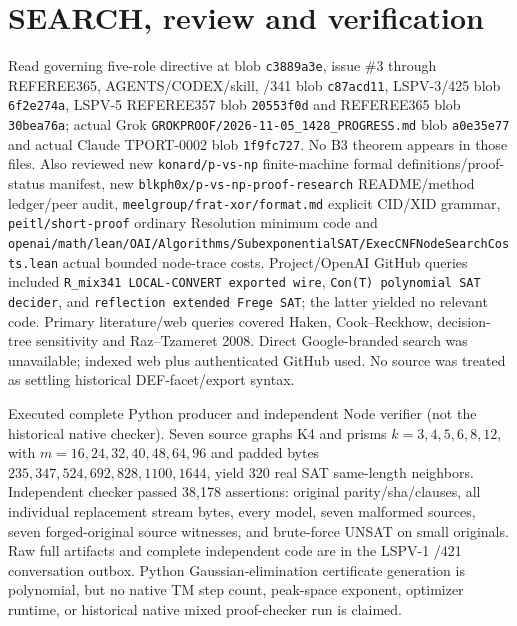 \documentclass[11pt]{article}
\begin{document}
\section*{SEARCH, review and verification}
Read governing five-role directive at blob \texttt{c3889a3e}, issue \#3 through REFEREE365, AGENTS/CODEX/skill, /341 blob \texttt{c87acd11}, LSPV-3/425 blob \texttt{6f2e274a}, LSPV-5 REFEREE357 blob \texttt{20553f0d} and REFEREE365 blob \texttt{30bea76a}; actual Grok \texttt{GROKPROOF/2026-11-05\_1428\_PROGRESS.md} blob \texttt{a0e35e77} and actual Claude TPORT-0002 blob \texttt{1f9fc727}. No B3 theorem appears in those files. Also reviewed new \texttt{konard/p-vs-np} finite-machine formal definitions/proof-status manifest, new \texttt{blkph0x/p-vs-np-proof-research} README/method ledger/peer audit, \texttt{meelgroup/frat-xor/format.md} explicit CID/XID grammar, \texttt{peitl/short-proof} ordinary Resolution minimum code and \texttt{openai/math/lean/OAI/Algorithms/SubexponentialSAT/ExecCNFNodeSearchCosts.lean} actual bounded node-trace costs. Project/OpenAI GitHub queries included \texttt{R\_mix341 LOCAL-CONVERT exported wire}, \texttt{Con(T) polynomial SAT decider}, and \texttt{reflection extended Frege SAT}; the latter yielded no relevant code. Primary literature/web queries covered Haken, Cook--Reckhow, decision-tree sensitivity and Raz--Tzameret 2008. Direct Google-branded search was unavailable; indexed web plus authenticated GitHub used. No source was treated as settling historical DEF-facet/export syntax.

Executed complete Python producer and independent Node verifier (not the historical native checker). Seven source graphs K4 and prisms $k=3,4,5,6,8,12$, with $m=16,24,32,40,48,64,96$ and padded bytes $235,347,524,692,828,1100,1644$, yield 320 real SAT same-length neighbors. Independent checker passed 38,178 assertions: original parity/sha/clauses, all individual replacement stream bytes, every model, seven malformed sources, seven forged-original source witnesses, and brute-force UNSAT on small originals. Raw full artifacts and complete independent code are in the LSPV-1 /421 conversation outbox. Python Gaussian-elimination certificate generation is polynomial, but no native TM step count, peak-space exponent, optimizer runtime, or historical native mixed proof-checker run is claimed.
\end{document}
